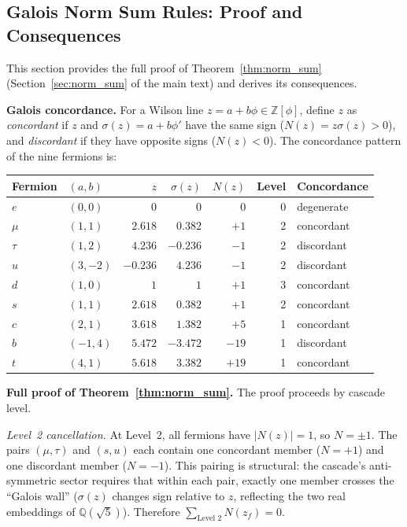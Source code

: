 \documentclass[12pt,a4paper]{article}
\theoremstyle{definition}
\begin{document}
\subsection{Galois Norm Sum Rules: Proof and Consequences}
\label{sec:S-norm-sum}

This section provides the full proof of Theorem~\ref{thm:norm_sum} (Section~\ref{sec:norm_sum} of the main text) and derives its consequences.

\textbf{Galois concordance.}  For a Wilson line $z = a + b\phi \in \mathbb{Z}[\phi]$, define $z$ as \emph{concordant} if $z$ and $\sigma(z) = a + b\phi'$ have the same sign ($N(z) = z\sigma(z) > 0$), and \emph{discordant} if they have opposite signs ($N(z) < 0$).  The concordance pattern of the nine fermions is:

\begin{center}
\begin{tabular}{llrrrrl}
\toprule
\textbf{Fermion} & $(a,b)$ & $z$ & $\sigma(z)$ & $N(z)$ & \textbf{Level} & \textbf{Concordance} \\
\midrule
$e$ & $(0,0)$ & $0$ & $0$ & $0$ & 0 & degenerate \\
$\mu$ & $(1,1)$ & $2.618$ & $0.382$ & $+1$ & 2 & concordant \\
$\tau$ & $(1,2)$ & $4.236$ & $-0.236$ & $-1$ & 2 & discordant \\
$u$ & $(3,-2)$ & $-0.236$ & $4.236$ & $-1$ & 2 & discordant \\
$d$ & $(1,0)$ & $1$ & $1$ & $+1$ & 3 & concordant \\
$s$ & $(1,1)$ & $2.618$ & $0.382$ & $+1$ & 2 & concordant \\
$c$ & $(2,1)$ & $3.618$ & $1.382$ & $+5$ & 1 & concordant \\
$b$ & $(-1,4)$ & $5.472$ & $-3.472$ & $-19$ & 1 & discordant \\
$t$ & $(4,1)$ & $5.618$ & $3.382$ & $+19$ & 1 & concordant \\
\bottomrule
\end{tabular}
\end{center}

\textbf{Full proof of Theorem~\ref{thm:norm_sum}.}
The proof proceeds by cascade level.

\emph{Level~2 cancellation.}  At Level~2, all fermions have $|N(z)| = 1$, so $N = \pm 1$.  The pairs $(\mu, \tau)$ and $(s, u)$ each contain one concordant member ($N = +1$) and one discordant member ($N = -1$).  This pairing is structural: the cascade's anti-symmetric sector requires that within each pair, exactly one member crosses the ``Galois wall'' ($\sigma(z)$ changes sign relative to $z$, reflecting the two real embeddings of $\mathbb{Q}(\sqrt{5})$).  Therefore $\sum_{\text{Level 2}} N(z_f) = 0$.
\end{document}

